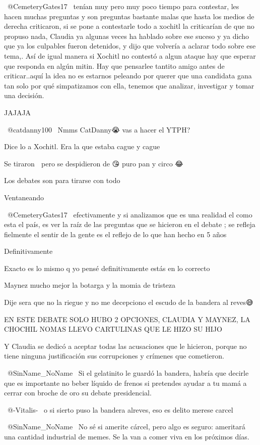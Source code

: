  @CemeteryGates17  tenían muy pero muy poco tiempo para contestar, les hacen muchas preguntas y son preguntas bastante malas que hasta los medios de derecha criticaron, si se pone a contestarle todo a xochitl la criticarían de que no propuso nada, Claudia ya algunas veces ha hablado sobre ese suceso y ya dicho que ya los culpables fueron detenidos, y dijo que volvería a aclarar todo sobre ese tema,. Así de igual manera si Xochitl no contestó a algun ataque hay que esperar que responda en algún mitin. Hay que pensarlee tantito amigo antes de criticar..aquí la idea no es estarnos peleando por querer que una candidata gana tan solo por qué simpatizamos con ella, tenemos que analizar, investigar y tomar una decisión.

JAJAJA

 @catdanny100  Nmms CatDanny😭 vas a hacer el YTPH?

Dice lo a Xochitl. Era la que estaba cague y cague

Se tiraron 💩 pero se despidieron de 😘 puro pan y circo 😂

Los debates son para tirarse con todo

Ventaneando

​ @CemeteryGates17  efectivamente y si analizamos que es una realidad el como esta el país, es ver la raíz de las preguntas que se hicieron en el debate ; se refleja fielmente el sentir de la gente  es el reflejo de lo que han hecho en 5 años

Definitivamente

Exacto es lo mismo q yo pensé definitivamente estás en lo correcto

Maynez mucho mejor la botarga y la momia de tristeza

Dije sera que no la riegue y no me decepciono el escudo de la bandera al reves😅

EN ESTE DEBATE SOLO HUBO 2 OPCIONES, CLAUDIA Y MAYNEZ, LA CHOCHIL NOMAS LLEVO CARTULINAS QUE LE HIZO SU HIJO

Y Claudia se dedicó a aceptar todas las acusaciones que le hicieron, porque no tiene ninguna justificación sus corrupciones y crímenes que cometieron.

 @SinName_NoName  Si el gelatinito le guardó la bandera, habría que decirle que es importante no beber líquido de frenos si pretendes ayudar a tu mamá a cerrar con broche de oro su debate presidencial.

 @-Vitalis-  o si sierto puso la bandera alreves, eso es delito merese carcel

 @SinName_NoName  No sé si amerite cárcel, pero algo es seguro: ameritará una cantidad industrial de memes. Se la van a comer viva en los próximos días.

